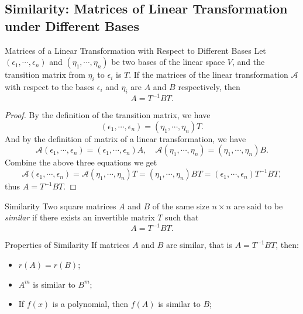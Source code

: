 \subsection{Similarity: Matrices of Linear Transformation under Different Bases}

\begin{theorem}{Matrices of a Linear Transformation with Respect to Different Bases}{}
  Let $(\epsilon_1,\cdots,\epsilon_n)$ and $(\eta_1,\cdots,\eta_n)$ be two bases
  of the linear space $V$,
  and the transition matrix from $\eta_i$ to $\epsilon_i$ is $T$.
  If the matrices of the linear transformation $\mathcal{A}$ with respect to the
  bases $\epsilon_i$ and $\eta_i$ are $A$ and $B$ respectively, then
  \begin{equation}
    A = T^{-1}BT.
  \end{equation}
\end{theorem}

\begin{proof}
  By the definition of the transition matrix, we have
  \begin{equation}
    (\epsilon_1,\cdots,\epsilon_n) = (\eta_1,\cdots,\eta_n)T.
  \end{equation}
  And by the definition of matrix of a linear transformation, we have
  \begin{equation}
    \mathcal{A}(\epsilon_1,\cdots,\epsilon_n) = (\epsilon_1,\cdots,\epsilon_n) A, \quad
    \mathcal{A}(\eta_1,\cdots,\eta_n) = (\eta_1,\cdots,\eta_n)B.
  \end{equation}
  Combine the above three equations we get
  \begin{equation}
    \mathcal{A}(\epsilon_1,\cdots,\epsilon_n) = \mathcal{A}(\eta_1,\cdots,\eta_n)T = (\eta_1,\cdots,\eta_n)BT
    = (\epsilon_1,\cdots,\epsilon_n)T^{-1}BT,
  \end{equation}
  thus $A = T^{-1}BT$.
\end{proof}

\begin{definition}{Similarity}{}
  Two square matrices $A$ and $B$ of the same size $n \times n$ are said to be
  \emph{similar} if there exists an invertible matrix $T$ such that
  \begin{equation}
    A = T^{-1}BT.
  \end{equation}
\end{definition}

\begin{proposition}{Properties of Similarity}{}
  If matrices $A$ and $B$ are similar, that is $A = T^{-1}BT$,
  then:
  \begin{itemize}
  \item $r(A) = r(B)$;
  \item $A^m$ is similar to $B^{m}$;
  \item If $f(x)$ is a polynomial, then $f(A)$ is similar to $B$;
  \end{itemize}
\end{proposition}

